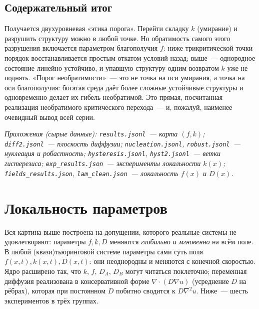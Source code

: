 \documentclass[11pt]{article}
\newcommand{\hruleline}{\vspace{-2pt}{\color{acrule}\hrule height 0.6pt}\vspace{6pt}}
\begin{document}
\subsection{Содержательный итог}
Получается двухуровневая «этика порога». Перейти складку $k$ (умирание) и разрушить структуру можно в
любой точке. Но обратимость самого этого разрушения включается параметром благополучия $f$: ниже
трикритической точки порядок восстанавливается простым откатом условий назад; выше~— однородное
состояние линейно устойчиво, и упавшую структуру одним возвратом $k$ уже не поднять. «Порог
необратимости»~— это не точка на оси умирания, а точка на оси благополучия: богатая среда даёт более
сложные устойчивые структуры и одновременно делает их гибель необратимой. Это прямая, посчитанная
реализация необратимого критического перехода~— и, пожалуй, наименее очевидный вывод всей серии.

\vspace{6mm}\hruleline
{\small\itshape\color{acgrey}
Приложения (сырые данные): \texttt{results.jsonl}~— карта $(f,k)$; \texttt{diff2.jsonl}~— плоскость
диффузии; \texttt{nucleation.jsonl}, \texttt{robust.jsonl}~— нуклеация и робастность;
\texttt{hysteresis.jsonl}, \texttt{hyst2.jsonl}~— ветки гистерезиса;
\texttt{exp\_results.json}~— эксперименты локальности $k(x)$; \texttt{fields\_results.json}, \texttt{lam\_clean.json}~— локальность $f(x)$ и $D(x)$.}
\clearpage

\section{Локальность параметров}
\hruleline
Вся картина выше построена на допущении, которого реальные системы не удовлетворяют: параметры $f,k,D$
меняются \emph{глобально и мгновенно} на всём поле. В любой (квази)тьюринговой системе параметры сами суть
поля $f(x,t),k(x,t),D(x,t)$: они неоднородны и меняются с конечной скоростью. Ядро расширено так, что $k$,
$f$, $D_A$, $D_B$ могут читаться поклеточно; переменная диффузия реализована в консервативной форме
$\nabla\cdot(D\nabla u)$ (усреднение $D$ на рёбрах), которая при постоянном $D$ побитно сводится к
$D\nabla^2u$. Ниже~— шесть экспериментов в трёх группах.
\end{document}
